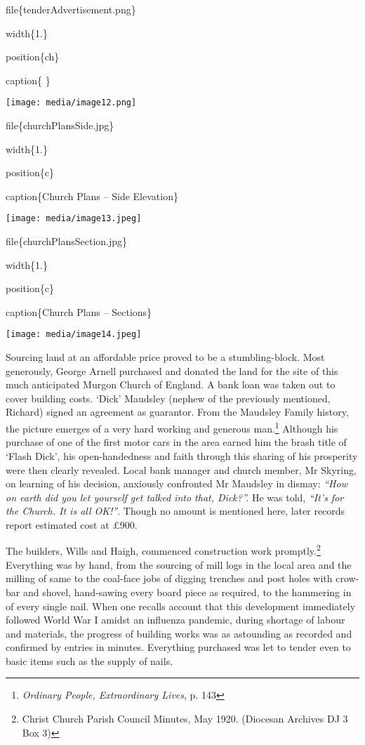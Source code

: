 file\{tenderAdvertisement.png\}

width\{1.\}

position\{ch\}

caption\{ \}

\texttt{[image: media/image12.png]}

file\{churchPlansSide.jpg\}

width\{1.\}

position\{c\}

caption\{Church Plans -- Side Elevation\}

\texttt{[image: media/image13.jpeg]}

file\{churchPlansSection.jpg\}

width\{1.\}

position\{c\}

caption\{Church Plans -- Sections\}

\texttt{[image: media/image14.jpeg]}

Sourcing land at an affordable price proved to be a stumbling-block. Most generously, George Arnell purchased and donated the land for the site of this much anticipated Murgon Church of England. A bank loan was taken out to cover building costs. `Dick' Maudsley (nephew of the previously mentioned, Richard) signed an agreement as guarantor. From the Maudsley Family history, the picture emerges of a very hard working and generous man.\footnote{\emph{Ordinary People, Extraordinary Lives}, p. 143} Although his purchase of one of the first motor cars in the area earned him the brash title of `Flash Dick', his open-handedness and faith through this sharing of his prosperity were then clearly revealed. Local bank manager and church member, Mr Skyring, on learning of his decision, anxiously confronted Mr Maudsley in dismay: \emph{``How on earth did you let yourself get talked into that, Dick?''.} He was told, \emph{``It's for the Church. It is all OK!''}. Though no amount is mentioned here, later records report estimated cost at £900.

The builders, Wills and Haigh, commenced construction work promptly.\footnote{Christ Church Parish Council Minutes, May 1920. (Diocesan Archives DJ 3 Box 3)} Everything was by hand, from the sourcing of mill logs in the local area and the milling of same to the coal-face jobs of digging trenches and post holes with crow-bar and shovel, hand-sawing every board piece as required, to the hammering in of every single nail. When one recalls account that this development immediately followed World War I amidst an influenza pandemic, during shortage of labour and materials, the progress of building works was as astounding as recorded and confirmed by entries in minutes. Everything purchased was let to tender even to basic items such as the supply of nails.

